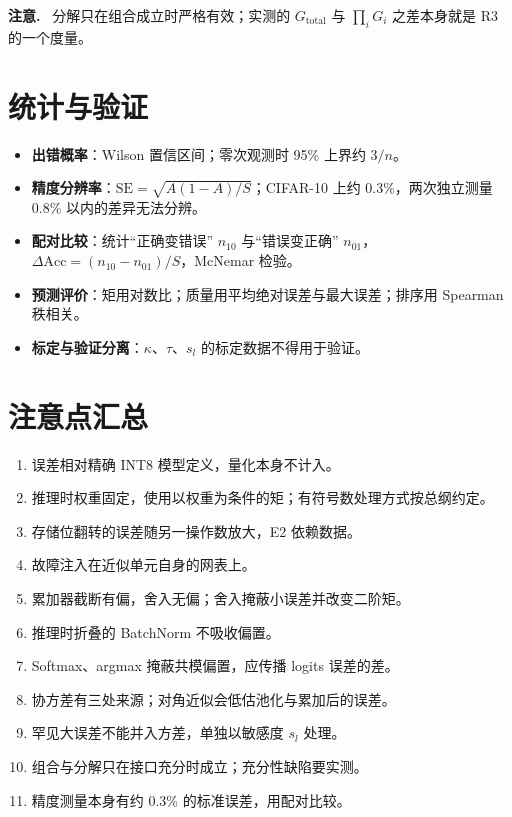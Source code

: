 \documentclass[11pt,a4paper]{ctexart}
\newenvironment{caution}{\par\medskip\noindent\textbf{注意.}\ }{\par\medskip}
\begin{document}
\begin{caution}
分解只在组合成立时严格有效；实测的 $G_{\text{total}}$ 与 $\prod_i G_i$ 之差本身就是 R3 的一个度量。
\end{caution}

\section{统计与验证}
\begin{itemize}[leftmargin=*]
  \item \textbf{出错概率}：Wilson 置信区间；零次观测时 95\% 上界约 $3/n$。
  \item \textbf{精度分辨率}：$\text{SE} = \sqrt{A(1-A)/S}$；CIFAR-10 上约 0.3\%，两次独立测量 0.8\% 以内的差异无法分辨。
  \item \textbf{配对比较}：统计“正确变错误” $n_{10}$ 与“错误变正确” $n_{01}$，$\Delta\text{Acc} = (n_{10}-n_{01})/S$，McNemar 检验。
  \item \textbf{预测评价}：矩用对数比；质量用平均绝对误差与最大误差；排序用 Spearman 秩相关。
  \item \textbf{标定与验证分离}：$\kappa$、$\tau$、$s_l$ 的标定数据不得用于验证。
\end{itemize}

\section{注意点汇总}
\begin{enumerate}[leftmargin=*]
  \item 误差相对精确 INT8 模型定义，量化本身不计入。
  \item 推理时权重固定，使用以权重为条件的矩；有符号数处理方式按总纲约定。
  \item 存储位翻转的误差随另一操作数放大，E2 依赖数据。
  \item 故障注入在近似单元自身的网表上。
  \item 累加器截断有偏，舍入无偏；舍入掩蔽小误差并改变二阶矩。
  \item 推理时折叠的 BatchNorm 不吸收偏置。
  \item Softmax、argmax 掩蔽共模偏置，应传播 logits 误差的差。
  \item 协方差有三处来源；对角近似会低估池化与累加后的误差。
  \item 罕见大误差不能并入方差，单独以敏感度 $s_l$ 处理。
  \item 组合与分解只在接口充分时成立；充分性缺陷要实测。
  \item 精度测量本身有约 0.3\% 的标准误差，用配对比较。
\end{enumerate}
\end{document}
